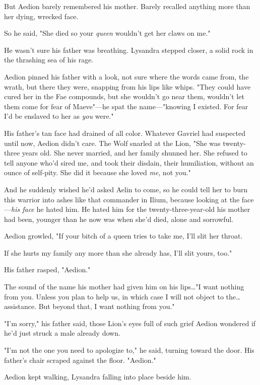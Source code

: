 But Aedion barely remembered his mother.
Barely recalled anything more than her dying, wrecked face.

So he said, "She died so your \emph{queen} wouldn't get her claws on me."

He wasn't sure his father was breathing.
Lysandra stepped closer, a solid rock in the thrashing sea of his rage.

Aedion pinned his father with a look, not sure where the words came from, the wrath, but there they were, snapping from his lips like whips.
"They could have cured her in the Fae compounds, but she wouldn't go near them, wouldn't let them come for fear of Maeve"---he spat the name---"knowing I existed.
For fear I'd be enslaved to her as \emph{you} were."

His father's tan face had drained of all color.
Whatever Gavriel had suspected until now, Aedion didn't care.
The Wolf snarled at the Lion, "She was twenty-three years old.
She never married, and her family shunned her.
She refused to tell anyone who'd sired me, and took their disdain, their humiliation, without an ounce of self-pity.
She did it because she loved \emph{me}, not you."

And he suddenly wished he'd asked Aelin to come, so he could tell her to burn this warrior into ashes like that commander in Ilium, because looking at the face---\emph{his face}  he hated him.
He hated him for the twenty-three-year-old his mother had been, younger than he now was when she'd died, alone and sorrowful.

Aedion growled, "If your bitch of a queen tries to take me, I'll slit her throat.

If she hurts my family any more than she already has, I'll slit yours, too."

His father rasped, "Aedion."

The sound of the name his mother had given him on his lips\ldots "I want nothing from you.
Unless you plan to help us, in which case I will not object to the\ldots assistance.
But beyond that, I want nothing from you."

"I'm sorry," his father said, those Lion's eyes full of such grief Aedion wondered if he'd just struck a male already down.

"I'm not the one you need to apologize to," he said, turning toward the door.
His father's chair scraped against the floor.
"Aedion."

Aedion kept walking, Lysandra falling into place beside him.

